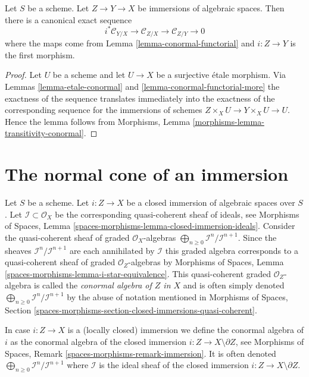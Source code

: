 \begin{lemma}
\label{lemma-transitivity-conormal}
Let $S$ be a scheme.
Let $Z \to Y \to X$ be immersions of algebraic spaces.
Then there is a canonical exact sequence
$$
i^*\mathcal{C}_{Y/X} \to
\mathcal{C}_{Z/X} \to
\mathcal{C}_{Z/Y} \to 0
$$
where the maps come from
Lemma \ref{lemma-conormal-functorial}
and $i : Z \to Y$ is the first morphism.
\end{lemma}

\begin{proof}
Let $U$ be a scheme and let $U \to X$ be a surjective \'etale morphism. Via
Lemmas \ref{lemma-etale-conormal} and \ref{lemma-conormal-functorial-more}
the exactness of the sequence translates immediately into the
exactness of the corresponding sequence for the immersions of schemes
$Z \times_X U \to Y \times_X U \to U$. Hence the lemma follows from
Morphisms, Lemma \ref{morphisms-lemma-transitivity-conormal}.
\end{proof}








\section{The normal cone of an immersion}
\label{section-normal-cone}

\noindent
Let $S$ be a scheme. Let $i : Z \to X$ be a closed immersion of algebraic
spaces over $S$. Let $\mathcal{I} \subset \mathcal{O}_X$ be the
corresponding quasi-coherent sheaf of ideals, see
Morphisms of Spaces, Lemma
\ref{spaces-morphisms-lemma-closed-immersion-ideals}.
Consider the quasi-coherent sheaf of graded $\mathcal{O}_X$-algebras
$\bigoplus_{n \geq 0} \mathcal{I}^n/\mathcal{I}^{n + 1}$.
Since the sheaves $\mathcal{I}^n/\mathcal{I}^{n + 1}$
are each annihilated by $\mathcal{I}$ this graded algebra
corresponds to a quasi-coherent sheaf of graded $\mathcal{O}_Z$-algebras by
Morphisms of Spaces, Lemma \ref{spaces-morphisms-lemma-i-star-equivalence}.
This quasi-coherent graded $\mathcal{O}_Z$-algebra is called the
{\it conormal algebra of $Z$ in $X$} and is often simply denoted
$\bigoplus_{n \geq 0} \mathcal{I}^n/\mathcal{I}^{n + 1}$
by the abuse of notation mentioned in
Morphisms of Spaces, Section
\ref{spaces-morphisms-section-closed-immersions-quasi-coherent}.

\medskip\noindent
In case $i : Z \to X$ is a (locally closed) immersion we define the conormal
algebra of $i$ as the conormal algebra of the closed immersion
$i : Z \to X \setminus \partial Z$, see Morphisms of Spaces, Remark
\ref{spaces-morphisms-remark-immersion}.
It is often denoted
$\bigoplus_{n \geq 0} \mathcal{I}^n/\mathcal{I}^{n + 1}$
where $\mathcal{I}$ is the ideal sheaf
of the closed immersion $i : Z \to X \setminus \partial Z$.

